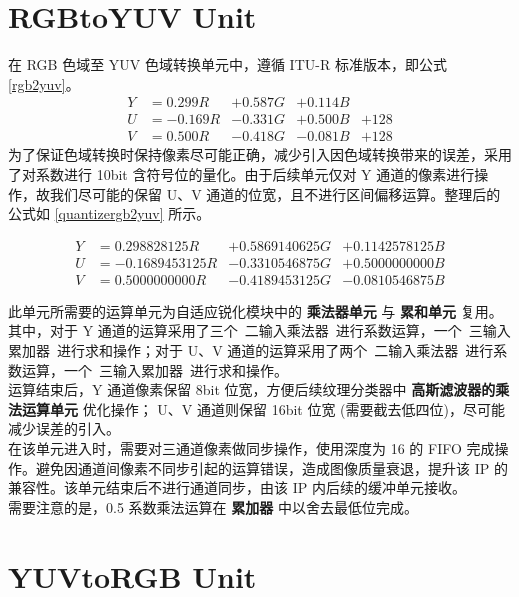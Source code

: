 \documentclass[12pt, a4paper, oneside]{ctexbook}
\begin{document}
	\section{RGBtoYUV Unit}
	在 RGB 色域至 YUV 色域转换单元中，遵循 ITU-R 标准版本，即公式 \ref{rgb2yuv}。
	\begin{equation} \label{rgb2yuv}
		\begin{aligned}
			Y &= 0.299R &+ 0.587G &+ 0.114B \\
			U &= -0.169R &- 0.331G& + 0.500B &+ 128 \\
			V &= 0.500R &- 0.418G &- 0.081B &+ 128
		\end{aligned}
	\end{equation}
	为了保证色域转换时保持像素尽可能正确，减少引入因色域转换带来的误差，采用了对系数进行 10bit 含符号位的量化。由于后续单元仅对 Y 通道的像素进行操作，故我们尽可能的保留 U、V 通道的位宽，且不进行区间偏移运算。整理后的公式如 \ref{quantizergb2yuv} 所示。
	
	\begin{equation} \label{quantizergb2yuv}
		\begin{aligned}
			Y &= 0.298828125 R &+ 0.5869140625 G &+ 0.1142578125 B \\
			U &= -0.1689453125 R &- 0.3310546875 G& + 0.5000000000 B \\
			V &= 0.5000000000 R&- 0.4189453125 G&- 0.0810546875 B
		\end{aligned}
	\end{equation}

	此单元所需要的运算单元为自适应锐化模块中的 \textbf{乘法器单元} 与 \textbf{累和单元} 复用。其中，对于 Y 通道的运算采用了三个\ 二输入乘法器\ 进行系数运算，一个\ 三输入累加器\ 进行求和操作；对于 U、V 通道的运算采用了两个\ 二输入乘法器\ 进行系数运算，一个\ 三输入累加器\ 进行求和操作。\\

	运算结束后，Y 通道像素保留 8bit 位宽，方便后续纹理分类器中 \textbf{高斯滤波器的乘法运算单元} 优化操作； U、V 通道则保留 16bit 位宽 (需要截去低四位)，尽可能减少误差的引入。\\
	
	在该单元进入时，需要对三通道像素做同步操作，使用深度为 16 的 FIFO 完成操作。避免因通道间像素不同步引起的运算错误，造成图像质量衰退，提升该 IP 的兼容性。该单元结束后不进行通道同步，由该 IP 内后续的缓冲单元接收。\\
	
	需要注意的是，0.5 系数乘法运算在 \textbf{累加器} 中以舍去最低位完成。
	
	\section{YUVtoRGB Unit}
	
\end{document}
